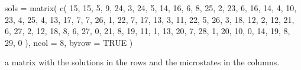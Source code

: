 \documentclass[
]{article}
\newenvironment{Shaded}{\begin{snugshade}}{\end{snugshade}}
\newcommand{\AttributeTok}[1]{\textcolor[rgb]{0.77,0.63,0.00}{#1}}
\newcommand{\ConstantTok}[1]{\textcolor[rgb]{0.00,0.00,0.00}{#1}}
\newcommand{\DecValTok}[1]{\textcolor[rgb]{0.00,0.00,0.81}{#1}}
\newcommand{\FunctionTok}[1]{\textcolor[rgb]{0.00,0.00,0.00}{#1}}
\newcommand{\NormalTok}[1]{#1}
\newcommand{\OtherTok}[1]{\textcolor[rgb]{0.56,0.35,0.01}{#1}}
\begin{document}
\begin{Shaded}
\begin{Highlighting}[]
\NormalTok{sols }\OtherTok{=} \FunctionTok{matrix}\NormalTok{(}
    \FunctionTok{c}\NormalTok{(}
        \DecValTok{15}\NormalTok{, }\DecValTok{15}\NormalTok{, }\DecValTok{5}\NormalTok{, }\DecValTok{9}\NormalTok{, }\DecValTok{24}\NormalTok{, }\DecValTok{3}\NormalTok{, }\DecValTok{24}\NormalTok{, }\DecValTok{5}\NormalTok{,}
        \DecValTok{14}\NormalTok{, }\DecValTok{16}\NormalTok{, }\DecValTok{6}\NormalTok{, }\DecValTok{8}\NormalTok{, }\DecValTok{25}\NormalTok{, }\DecValTok{2}\NormalTok{, }\DecValTok{23}\NormalTok{, }\DecValTok{6}\NormalTok{,}
        \DecValTok{16}\NormalTok{, }\DecValTok{14}\NormalTok{, }\DecValTok{4}\NormalTok{, }\DecValTok{10}\NormalTok{, }\DecValTok{23}\NormalTok{, }\DecValTok{4}\NormalTok{, }\DecValTok{25}\NormalTok{, }\DecValTok{4}\NormalTok{,}
        \DecValTok{13}\NormalTok{, }\DecValTok{17}\NormalTok{, }\DecValTok{7}\NormalTok{, }\DecValTok{7}\NormalTok{, }\DecValTok{26}\NormalTok{, }\DecValTok{1}\NormalTok{, }\DecValTok{22}\NormalTok{, }\DecValTok{7}\NormalTok{,}
        \DecValTok{17}\NormalTok{, }\DecValTok{13}\NormalTok{, }\DecValTok{3}\NormalTok{, }\DecValTok{11}\NormalTok{, }\DecValTok{22}\NormalTok{, }\DecValTok{5}\NormalTok{, }\DecValTok{26}\NormalTok{, }\DecValTok{3}\NormalTok{,}
        \DecValTok{18}\NormalTok{, }\DecValTok{12}\NormalTok{, }\DecValTok{2}\NormalTok{, }\DecValTok{12}\NormalTok{, }\DecValTok{21}\NormalTok{, }\DecValTok{6}\NormalTok{, }\DecValTok{27}\NormalTok{, }\DecValTok{2}\NormalTok{,}
        \DecValTok{12}\NormalTok{, }\DecValTok{18}\NormalTok{, }\DecValTok{8}\NormalTok{, }\DecValTok{6}\NormalTok{, }\DecValTok{27}\NormalTok{, }\DecValTok{0}\NormalTok{, }\DecValTok{21}\NormalTok{, }\DecValTok{8}\NormalTok{,}
        \DecValTok{19}\NormalTok{, }\DecValTok{11}\NormalTok{, }\DecValTok{1}\NormalTok{, }\DecValTok{13}\NormalTok{, }\DecValTok{20}\NormalTok{, }\DecValTok{7}\NormalTok{, }\DecValTok{28}\NormalTok{, }\DecValTok{1}\NormalTok{, }
        \DecValTok{20}\NormalTok{, }\DecValTok{10}\NormalTok{, }\DecValTok{0}\NormalTok{, }\DecValTok{14}\NormalTok{, }\DecValTok{19}\NormalTok{, }\DecValTok{8}\NormalTok{, }\DecValTok{29}\NormalTok{, }\DecValTok{0} 
\NormalTok{    ),}
    \AttributeTok{ncol =} \DecValTok{8}\NormalTok{,}
    \AttributeTok{byrow =} \ConstantTok{TRUE}
\NormalTok{)}
\end{Highlighting}
\end{Shaded}

a matrix with the solutions in the rows and the microstates in the
columns.
\end{document}
